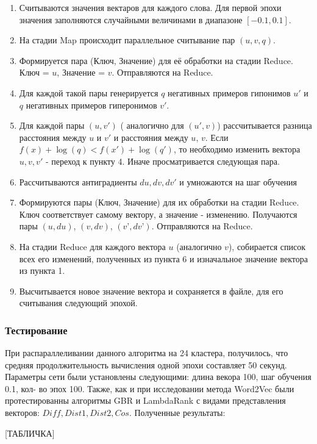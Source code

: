 \begin{enumerate}
\item Считываются значения вектаров для каждого слова. Для первой эпохи значения
заполняются случайными величинами в диапазоне $[-0.1, 0.1]$.

\item На стадии Map происходит параллельное считывание пар $(u, v, q)$.

\item Формируется пара (Ключ, Значение) для её обработки на стадии Reduce. Ключ = $u$,
Значение = $v$. Отправляются на Reduce.

\item Для каждой такой пары генерируется $q$ негативных примеров гипонимов $u'$ и $q$
негативных примеров гиперонимов $v'$.

\item Для каждой пары $(u, v')$ ( аналогично для $(u', v)$) рассчитывается разница расстояния между $u$ и $v'$ и расстояния между $u$, $v$. Если $f(x) + \log(q) < f(x') + \log(q')$, то необходимо изменить вектора $u, v, v'$ - переход к пункту 4. Иначе просматривается следующая
пара.

\item Рассчитываются антиградиенты $du, dv, dv'$ и умножаются на шаг обучения

\item Формируются пары (Ключ, Значение) для их обработки на стадии Reduce. Ключ
соответствует самому вектору, а значение - изменению. Получаются пары $(u, du)$, $(v,
dv)$, $(v’, dv’)$. Отправляются на Reduce.

\item На стадии Reduce для каждого вектора $u$ (аналогично $v$), собирается список всех
его изменений, полученных из пункта 6 и изначальное значение вектора из пункта 1.

\item Высчитывается новое значение вектора и сохраняется в файле, для его считывания
следующий эпохой.
\end{enumerate}


\subsubsection{Тестирование}

При распараллеливании данного алгоритма на 24 кластера, получилось, что средняя
продолжительность вычисления одной эпохи составляет 50 секунд.
Параметры сети были установлены следующими: длина векора 100, шаг обучения 0.1, кол-
во эпох 100.
Также, как и при исследовании метода Word2Vec были протестированны алгоритмы GBR и
LambdaRank с видами представления векторов: $Diff, Dist1, Dist2, Cos$.
Полученные результаты:

[ТАБЛИЧКА]